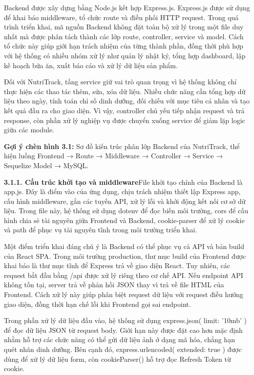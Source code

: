 Backend được xây dựng bằng Node.js kết hợp Express.js. Express.js được sử dụng để khai báo middleware, tổ chức route và điều phối HTTP request. Trong quá trình triển khai, mã nguồn Backend không đặt toàn bộ xử lý trong một file duy nhất mà được phân tách thành các lớp route, controller, service và model. Cách tổ chức này giúp giới hạn trách nhiệm của từng thành phần, đồng thời phù hợp với hệ thống có nhiều nhóm xử lý như quản lý nhật ký, tổng hợp dashboard, lập kế hoạch bữa ăn, xuất báo cáo và xử lý dữ liệu sản phẩm.

Đối với NutriTrack, tầng service giữ vai trò quan trọng vì hệ thống không chỉ thực hiện các thao tác thêm, sửa, xóa dữ liệu. Nhiều chức năng cần tổng hợp dữ liệu theo ngày, tính toán chỉ số dinh dưỡng, đối chiếu với mục tiêu cá nhân và tạo kết quả đầu ra cho giao diện. Vì vậy, controller chủ yếu tiếp nhận request và trả response, còn phần xử lý nghiệp vụ được chuyển xuống service để giảm lặp logic giữa các module.

\textbf{Gợi ý chèn hình 3.1:} Sơ đồ kiến trúc phân lớp Backend của NutriTrack, thể hiện luồng Frontend → Route → Middleware → Controller → Service → Sequelize Model → MySQL.

\textbf{3.1.1. Cấu trúc khởi tạo và middleware}File khởi tạo chính của Backend là app.js. Đây là điểm vào của ứng dụng, chịu trách nhiệm thiết lập Express app, cấu hình middleware, gắn các tuyến API, xử lý lỗi và khởi động kết nối cơ sở dữ liệu. Trong file này, hệ thống sử dụng dotenv để đọc biến môi trường, cors để cấu hình chia sẻ tài nguyên giữa Frontend và Backend, cookie-parser để xử lý cookie và path để phục vụ tài nguyên tĩnh trong môi trường triển khai.

Một điểm triển khai đáng chú ý là Backend có thể phục vụ cả API và bản build của React SPA. Trong môi trường production, thư mục build của Frontend được khai báo là thư mục tĩnh để Express trả về giao diện React. Tuy nhiên, các request bắt đầu bằng /api được xử lý riêng theo cơ chế API. Nếu endpoint API không tồn tại, server trả về phản hồi JSON thay vì trả về file HTML của Frontend. Cách xử lý này giúp phân biệt request dữ liệu với request điều hướng giao diện, đồng thời hạn chế lỗi khi Frontend gọi sai endpoint.

Trong phần xử lý dữ liệu đầu vào, hệ thống sử dụng express.json({ limit: '10mb' }) để đọc dữ liệu JSON từ request body. Giới hạn này được đặt cao hơn mặc định nhằm hỗ trợ các chức năng có thể gửi dữ liệu ảnh ở dạng mã hóa, chẳng hạn quét nhãn dinh dưỡng. Bên cạnh đó, express.urlencoded({ extended: true }) được dùng để xử lý dữ liệu form, còn cookieParser() hỗ trợ đọc Refresh Token từ cookie.

